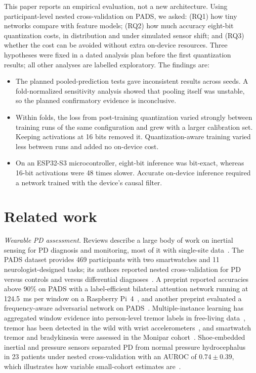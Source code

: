 \documentclass[preprint,12pt]{elsarticle}
\begin{document}
This paper reports an empirical evaluation, not a new architecture. Using participant-level nested cross-validation on PADS, we asked: (RQ1) how tiny networks compare with feature models; (RQ2) how much accuracy eight-bit quantization costs, in distribution and under simulated sensor shift; and (RQ3) whether the cost can be avoided without extra on-device resources. Three hypotheses were fixed in a dated analysis plan before the first quantization results; all other analyses are labelled exploratory. The findings are:
\begin{itemize}
  \item The planned pooled-prediction tests gave inconsistent results across seeds. A fold-normalized sensitivity analysis showed that pooling itself was unstable, so the planned confirmatory evidence is inconclusive.
  \item Within folds, the loss from post-training quantization varied strongly between training runs of the same configuration and grew with a larger calibration set. Keeping activations at 16 bits removed it. Quantization-aware training varied less between runs and added no on-device cost.
  \item On an ESP32-S3 microcontroller, eight-bit inference was bit-exact, whereas 16-bit activations were 48 times slower. Accurate on-device inference required a network trained with the device's causal filter.
\end{itemize}

\section{Related work}
\label{sec:related}
\emph{Wearable PD assessment.} Reviews describe a large body of work on inertial sensing for PD diagnosis and monitoring, most of it with single-site data~\cite{Rovini2017,Sigcha2023rev}. The PADS dataset provides 469 participants with two smartwatches and 11 neurologist-designed tasks; its authors reported nested cross-validation for PD versus controls and versus differential diagnoses~\cite{Varghese2024}. A preprint reported accuracies above 90\% on PADS with a label-efficient bilateral attention network running at 124.5~ms per window on a Raspberry Pi~4~\cite{Zannat2026}, and another preprint evaluated a frequency-aware adversarial network on PADS~\cite{Zhao2025MFAM}. Multiple-instance learning has aggregated window evidence into person-level tremor labels in free-living data~\cite{Papadopoulos2023,Ilse2018}, tremor has been detected in the wild with wrist accelerometers~\cite{SanSegundo2020}, and smartwatch tremor and bradykinesia were assessed in the Monipar cohort~\cite{Sigcha2021,Monipar2023}. Shoe-embedded inertial and pressure sensors separated PD from normal pressure hydrocephalus in 23 patients under nested cross-validation with an AUROC of $0.74 \pm 0.39$, which illustrates how variable small-cohort estimates are~\cite{Magni2026}.
\end{document}

